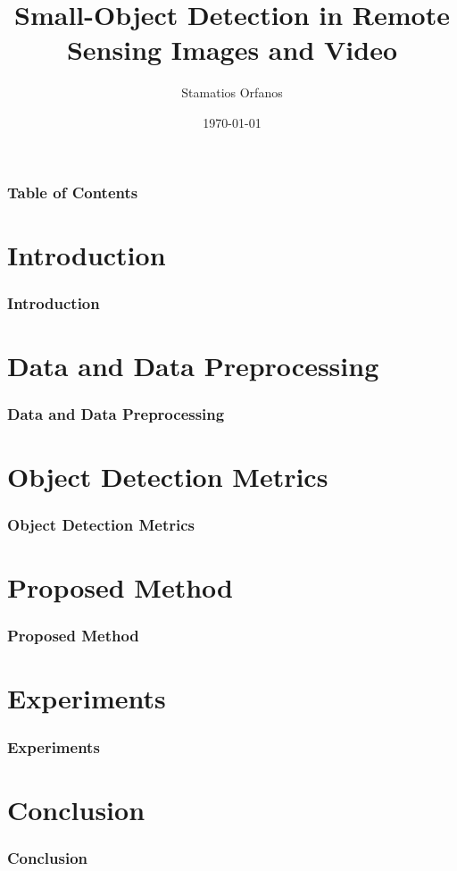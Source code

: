 \documentclass{beamer}
\title{Small-Object Detection in Remote Sensing Images and Video}
\author{Stamatios Orfanos}
\institute{University of Piraeus \hspace*{1cm} NCSR Demokritos}
\date{\today}
\begin{document}
\begin{frame}
  \titlepage
\end{frame}

\begin{frame}
  \frametitle{Table of Contents}
  \tableofcontents
\end{frame}

\section{Introduction}
\begin{frame}
  \frametitle{Introduction}
\end{frame}

\section{Data and Data Preprocessing}
\begin{frame}
  \frametitle{Data and Data Preprocessing}
\end{frame}

\section{Object Detection Metrics}
\begin{frame}
  \frametitle{Object Detection Metrics}
\end{frame}

\section{Proposed Method}
\begin{frame}
  \frametitle{Proposed Method}
\end{frame}

\section{Experiments}
\begin{frame}
  \frametitle{Experiments}
\end{frame}

\section{Conclusion}
\begin{frame}
  \frametitle{Conclusion}
\end{frame}
\end{document}
